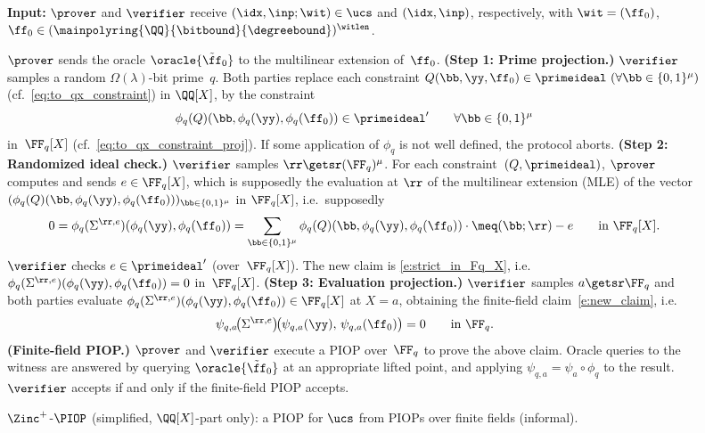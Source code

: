 \begin{figure}[H]
\caption{$\Zinc^+$-$\PIOP$ (simplified, $\QQ[X]$-part only): a PIOP for $\ucs$ from PIOPs over finite fields (informal).}
\label{a:tech_overview_zincplus_compiler}
\textbf{Input:} $\prover$ and $\verifier$ receive $(\idx, \inp;\wit)\in \ucs$ and $(\idx, \inp)$, respectively, with $\wit=(\ff_0)$, $\ff_0\in (\mainpolyring{\QQ}{\bitbound}{\degreebound})^{\witlen}$.
\begin{algorithmic}[1]
\STATE $\prover$ sends the oracle $\oracle{\tilde{\ff}_0}$ to the multilinear extension of~$\ff_0$.
\STATE \textbf{(Step 1: Prime projection.)} $\verifier$ samples a random $\Omega(\lambda)$-bit prime~$q$. Both parties replace each constraint $Q(\bb,\yy,\ff_0)\in \primeideal\ (\forall \bb\in \{0,1\}^\mu)$  (cf.\ \eqref{eq:to_qx_constraint}) in $\QQ[X]$,  by the constraint $$\phi_q(Q)(\bb,\phi_q(\yy),\phi_q(\ff_0))\in \primeideal' \qquad \forall \bb\in \{0,1\}^\mu$$  in~$\FF_q[X]$ (cf.\ \eqref{eq:to_qx_constraint_proj}). If some application of $\phi_q$ is not well defined, the protocol aborts. 
\STATE \textbf{(Step 2: Randomized ideal check.)} $\verifier$ samples $\rr\getsr (\FF_q)^\mu$. For each constraint~$(Q,\primeideal)$, $\prover$ computes and sends $e\in \FF_q[X]$, which is supposedly the evaluation at $\rr$ of the multilinear extension (MLE) of the vector $(\phi_q(Q)(\bb,\phi_q(\yy),\phi_q(\ff_0)))_{\bb\in \{0,1\}^\mu}$ in $\FF_q[X]$, i.e.\ supposedly $$0 =  \phi_q(\Sigma^{\rr,e})(\phi_q(\yy), \phi_q(\ff_0)) =\sum_{\bb\in\{0,1\}^\mu} \phi_q(Q)(\bb,\phi_q(\yy),\phi_q(\ff_0)) \cdot \meq(\bb;\rr) -e \qquad \text{in } \FF_q[X].$$   
$\verifier$ checks $e \in \primeideal'$ (over~$\FF_q[X]$). The new claim is \eqref{e:strict_in_Fq_X}, i.e.\ $\phi_q(\Sigma^{\rr,e})(\phi_q(\yy), \phi_q(\ff_0))=0$ in~$\FF_q[X]$.
\STATE \textbf{(Step 3: Evaluation projection.)} $\verifier$ samples $a\getsr \FF_q$ and both parties evaluate $\phi_q(\Sigma^{\rr,e})(\phi_q(\yy), \phi_q(\ff_0))\in \FF_q[X]$ at $X=a$, obtaining the finite-field claim~\eqref{e:new_claim}, i.e.\
\begin{equation}\label{eq:final_claim}
\psi_{q,a}\!\bigl(\Sigma^{\rr,e}\bigr)\!\bigl(\psi_{q,a}(\yy),\, \psi_{q,a}(\ff_0)\bigr) = 0 \qquad \text{in } \FF_q.
\end{equation}
\STATE \textbf{(Finite-field PIOP.)} $\prover$ and $\verifier$ execute a PIOP over~$\FF_q$ to prove the above claim. Oracle queries to the witness are answered by querying $\oracle{\tilde{\ff}_0}$ at an appropriate lifted point, and applying $\psi_{q,a} = \psi_a\circ \phi_q$ to the result.  $\verifier$ accepts if and only if the finite-field PIOP accepts.
\end{algorithmic}
\end{figure}

